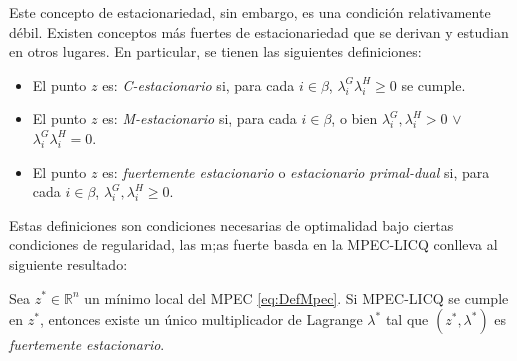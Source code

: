 Este concepto de estacionariedad, sin embargo, es una condición relativamente débil. Existen conceptos más fuertes de estacionariedad que se derivan y estudian en otros lugares. En particular, se tienen las siguientes definiciones:

\begin{itemize}
\item \begin{definition}
  El punto $z$ es: \textit{C-estacionario} si, para cada $i \in \beta$, $\lambda_i^G\lambda_i^H \geq 0$ se cumple.
\end{definition}
\item \begin{definition}
    El punto $z$ es: \textit{M-estacionario} si, para cada $i \in \beta$, o bien $\lambda_i^G,\lambda_i^H > 0$ $\vee$ $\lambda_i^G \lambda_i^H = 0$.
\end{definition}
\item \begin{definition}
    El punto $z$ es: \textit{fuertemente estacionario} o \textit{estacionario primal-dual} si, para cada $i \in \beta$, $\lambda_i^G, \lambda_i^H \geq 0$.
\end{definition}
\end{itemize}

Estas definiciones son condiciones necesarias de optimalidad bajo ciertas condiciones de regularidad, las m;as fuerte basda en la MPEC-LICQ conlleva al siguiente resultado:
\begin{theorem} 
Sea $z^* \in \mathbb{R}^n$ un mínimo local del MPEC \eqref{eq:DefMpec}. Si MPEC-LICQ se cumple en $z^*$, entonces existe un único multiplicador de Lagrange $\lambda^*$ tal que $(z^*, \lambda^*)$ es \textit{fuertemente estacionario}.
\end{theorem}

